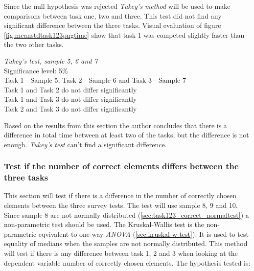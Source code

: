 Since the null hypothesis was rejected \textit{Tukey's method} will be used to make comparisons between task one, two and three. This test did not find any significant difference between the three tasks. Visual evaluation of figure \ref{fig:meanstdtask123pngtime} show that task 1 was competed slightly faster than the two other tasks. 

 \begin{center}
	\begin{tcolorbox}[width=0.8\textwidth]
		\centering
		\textit{Tukey's test, sample 5, 6 and 7}\\
		Significance level: 5\%  \\[0.5cm]
		Task 1 - Sample 5, Task 2 - Sample 6 and Task 3 - Sample 7 \\[0.5cm]
		
		Task 1 and Task 2 do not differ significantly \\
		Task 1 and Task 3 do not differ significantly \\
		Task 2 and Task 3 do not differ significantly \\[0.2cm]
	\end{tcolorbox} 
\end{center}

\vspace{0.3cm}
Based on the results from this section the author concludes that there is a difference in total time between at least two of the tasks, but the difference is not enough. \textit{Tukey's test} can't find a significant difference. 

\subsubsection[Sample 8, 9, and 10]{Test if the number of correct elements differs between the three tasks}\label{sec:sample_8_9_10_kruskal)} %

This section will test if there is a difference in the number of correctly chosen elements between the three survey tests. The test will use sample 8, 9 and 10. Since sample 8 are not normally distributed (\ref{sec:task123_correct_normaltest}) a non-parametric test should be used. The Kruskal-Wallis test is the non-parametric eqvivalent to one-way \textit{ANOVA} (\ref{sec:kruskal-w-test}). It is used to test equality of medians when the samples are not normally distributed. This method will test if there is any difference between task 1, 2 and 3 when looking at the dependent variable number of correctly chosen elements. The hypothesis tested is: \\[0.2cm]

